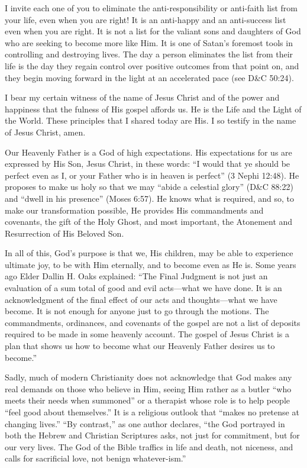 \documentclass[letterpaper, 11pt]{report}
\newcommand{\speaker}{}
\newcommand{\talk}{}
\newcommand{\setspeaker}[1]{\renewcommand{\speaker}{#1}}
\newcommand{\settalk}[1]{\renewcommand{\talk}{#1}}
\newcommand{\talkheading}[2]{%
    \vspace{1em}
    \noindent{\huge\bfseries #1}
    \par\nopagebreak\vspace{0.25em}
    \noindent{\normalsize\bfseries #2}
    \par\nopagebreak\vspace{0.5em}
}
\begin{document}
I invite each one of you to eliminate the anti-responsibility or anti-faith list from your life, even when you are right! It is an anti-happy and an anti-success list even when you are right. It is not a list for the valiant sons and daughters of God who are seeking to become more like Him. It is one of Satan’s foremost tools in controlling and destroying lives. The day a person eliminates the list from their life is the day they regain control over positive outcomes from that point on, and they begin moving forward in the light at an accelerated pace (see D\&C 50:24).

I bear my certain witness of the name of Jesus Christ and of the power and happiness that the fulness of His gospel affords us. He is the Life and the Light of the World. These principles that I shared today are His. I so testify in the name of Jesus Christ, amen.

\settalk{As Many as I Love, I Rebuke and Chasten}
\setspeaker{Elder D. Todd Christofferson}
\talkheading{As Many as I Love, I Rebuke and Chasten}{Elder D. Todd Christofferson}

Our Heavenly Father is a God of high expectations. His expectations for us are expressed by His Son, Jesus Christ, in these words: “I would that ye should be perfect even as I, or your Father who is in heaven is perfect” (3 Nephi 12:48). He proposes to make us holy so that we may “abide a celestial glory” (D\&C 88:22) and “dwell in his presence” (Moses 6:57). He knows what is required, and so, to make our transformation possible, He provides His commandments and covenants, the gift of the Holy Ghost, and most important, the Atonement and Resurrection of His Beloved Son.

In all of this, God’s purpose is that we, His children, may be able to experience ultimate joy, to be with Him eternally, and to become even as He is. Some years ago Elder Dallin H. Oaks explained: “The Final Judgment is not just an evaluation of a sum total of good and evil acts—what we have done. It is an acknowledgment of the final effect of our acts and thoughts—what we have become. It is not enough for anyone just to go through the motions. The commandments, ordinances, and covenants of the gospel are not a list of deposits required to be made in some heavenly account. The gospel of Jesus Christ is a plan that shows us how to become what our Heavenly Father desires us to become.”

Sadly, much of modern Christianity does not acknowledge that God makes any real demands on those who believe in Him, seeing Him rather as a butler “who meets their needs when summoned” or a therapist whose role is to help people “feel good about themselves.” It is a religious outlook that “makes no pretense at changing lives.” “By contrast,” as one author declares, “the God portrayed in both the Hebrew and Christian Scriptures asks, not just for commitment, but for our very lives. The God of the Bible traffics in life and death, not niceness, and calls for sacrificial love, not benign whatever-ism.”
\end{document}
